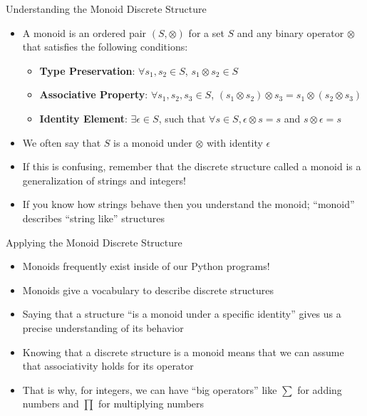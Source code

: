 \documentclass[14pt,aspectratio=169]{beamer}
\begin{document}
%
\begin{frame}{Understanding the Monoid Discrete Structure}
  \begin{itemize}
    \item A monoid is an ordered pair $(S, \otimes)$ for a set $S$ and any
      binary operator $\otimes$ that satisfies the following conditions:
      \begin{itemize}
        \item {\bf Type Preservation}: $\forall s_1, s_2 \in S$, $s_1 \otimes
          s_2 \in S$
        \item {\bf Associative Property}: $\forall s_1, s_2, s_3 \in S$, $(s_1
          \otimes s_2) \otimes s_3 = s_1 \otimes (s_2 \otimes s_3)$
        \item {\bf Identity Element}: $\exists \epsilon \in S$, such that
          $\forall s \in S, \epsilon \otimes s = s$ and $s \otimes \epsilon = s$
      \end{itemize}
      \vspace*{-.2in}
    \item We often say that $S$ is a monoid under $\otimes$ with identity
      $\epsilon$
      \vspace*{-.2in}
    \item If this is confusing, remember that the discrete structure called a
      monoid is a generalization of strings and integers!
      \vspace*{-.2in}
    \item If you know how strings behave then you understand the monoid;
      ``monoid'' describes ``string like'' structures
  \end{itemize}
\end{frame}

%
\begin{frame}{Applying the Monoid Discrete Structure}
  \begin{itemize}
    \item Monoids frequently exist inside of our Python programs!
      \vspace*{-.2in}
    \item Monoids give a vocabulary to describe discrete structures
      \vspace*{-.2in}
    \item Saying that a structure ``is a monoid under a specific identity''
      gives us a precise understanding of its behavior
      \vspace*{-.2in}
    \item Knowing that a discrete structure is a monoid means that we can assume
      that associativity holds for its operator
      \vspace*{-.2in}
    \item That is why, for integers, we can have ``big operators'' like $\sum$
      for adding numbers and $\prod$ for multiplying numbers
  \end{itemize}
\end{frame}
\end{document}
